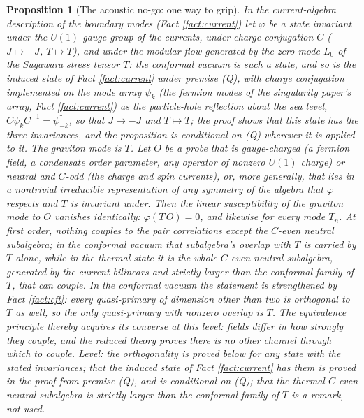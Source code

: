 \documentclass[11pt]{article}
\newtheorem{proposition}[theorem]{Proposition}
\theoremstyle{definition}
\begin{document}
\begin{proposition}[The acoustic no-go: one way to grip]\label{prop:nogo}
In the current-algebra description of the boundary modes (Fact \ref{fact:current}) let $\varphi$ be a state invariant under the $U(1)$ gauge group of the currents, under charge conjugation $C$ ($J \mapsto -J$, $T \mapsto T$), and under the modular flow generated by the zero mode $L_0$ of the Sugawara stress tensor $T$: the conformal vacuum is such a state, and so is the induced state of Fact \ref{fact:current} under premise (Q), with charge conjugation implemented on the mode array $\psi_k$ (the fermion modes of the singularity paper's array, Fact \ref{fact:current}) as the particle-hole reflection about the sea level, $C\psi_kC^{-1} = \psi^\dagger_{-k}$, so that $J \mapsto -J$ and $T \mapsto T$; the proof shows that this state has the three invariances, and the proposition is conditional on (Q) wherever it is applied to it. The graviton mode is $T$. Let $O$ be a probe that is gauge-charged (a fermion field, a condensate order parameter, any operator of nonzero $U(1)$ charge) or neutral and $C$-odd (the charge and spin currents), or, more generally, that lies in a nontrivial irreducible representation of any symmetry of the algebra that $\varphi$ respects and $T$ is invariant under. Then the linear susceptibility of the graviton mode to $O$ vanishes identically: $\varphi(T\,O) = 0$, and likewise for every mode $T_n$. At first order, nothing couples to the pair correlations except the $C$-even neutral subalgebra; in the conformal vacuum that subalgebra's overlap with $T$ is carried by $T$ alone, while in the thermal state it is the whole $C$-even neutral subalgebra, generated by the current bilinears and strictly larger than the conformal family of $T$, that can couple. In the conformal vacuum the statement is strengthened by Fact \ref{fact:cft}: every quasi-primary of dimension other than two is orthogonal to $T$ as well, so the only quasi-primary with nonzero overlap is $T$. The equivalence principle thereby acquires its converse at this level: fields differ in how strongly they couple, and the reduced theory proves there is no other channel through which to couple. \emph{Level:} the orthogonality is proved below for any state with the stated invariances; that the induced state of Fact \ref{fact:current} has them is proved in the proof from premise (Q), and is conditional on (Q); that the thermal $C$-even neutral subalgebra is strictly larger than the conformal family of $T$ is a remark, not used.
\end{proposition}
\end{document}
